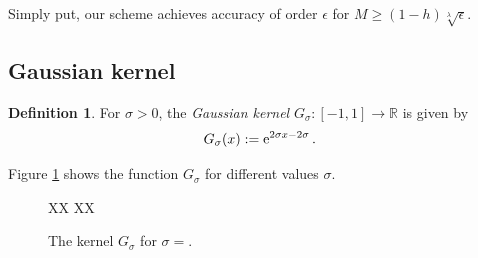 \documentclass[11pt,a4paper,twoside,bibtotoc]{scrartcl}
\theoremstyle{plain}
\theoremstyle{definition}
\newtheorem{definition}[theorem]{Definition}
\theoremstyle{remark}
\newcommand{\R}{\ensuremath{\mathbb{R}}}
\newcommand{\interv}[4]{\ensuremath{\left#1\left.#2,#3\right#4\right.}}
\newcommand{\fun}[2]{\ensuremath{#1{\hspace{-0.4ex}}\left(#2\right)}}
\newcommand{\e}{\mbox{\rm{e}}}
\numberwithin{equation}{section}
\numberwithin{table}{section}
\numberwithin{figure}{section}
\begin{document}
Simply put, our scheme achieves accuracy of order $\epsilon$ for $M \ge
(1-h)\sqrt[\lambda]{\epsilon}$.

\subsection{Gaussian kernel}
\begin{definition}
  For $\sigma>0$, the \emph{Gaussian kernel}
  $G_{\sigma}:\interv{[}{-1}{1}{]} \rightarrow \R$ is given by
  \begin{equation}
    \label{GaussKernel}
    \nonumber
    \fun{G_{\sigma}}{x} := \e^{2\sigma x-2\sigma}\,.
  \end{equation}
\end{definition}

Figure \ref{Basics:Figure:GKernel} shows the function $G_{\sigma}$ for
different values $\sigma$.
\begin{figure}[tb]
  \centering
  \subfigure[$\sigma=$]
  XX%
  \subfigure[$\sigma=$]
  XX%
  \caption{The kernel $G_{\sigma}$ for $\sigma = $.}
  \label{Basics:Figure:GKernel}
\end{figure}
\end{document}
